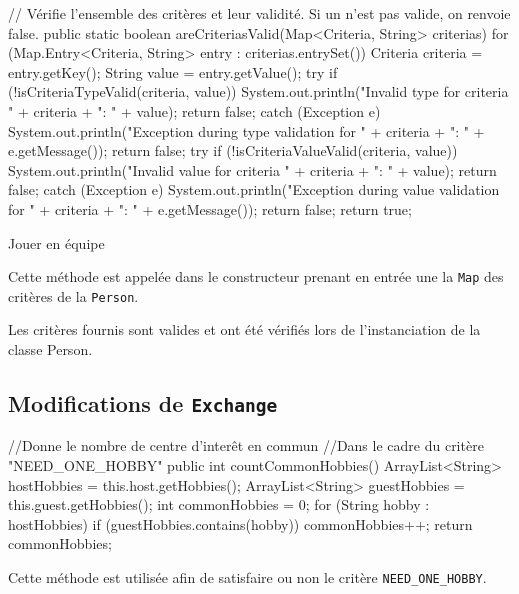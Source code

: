 \documentclass{mytex}
\begin{document}

\begin{codebox}
    // Vérifie l'ensemble des critères et leur validité. Si un n'est pas valide, on renvoie false.
public static boolean areCriteriasValid(Map<Criteria, String> criterias) {
	for (Map.Entry<Criteria, String> entry : criterias.entrySet()) {
		Criteria criteria = entry.getKey();
		String value = entry.getValue();
		try {
			if (!isCriteriaTypeValid(criteria, value)) {
				System.out.println("Invalid type for criteria " + criteria + ": " + value);
				return false;
			}
		} catch (Exception e) {
			System.out.println("Exception during type validation for " + criteria + ": " + e.getMessage());
			return false;
		}
		try {
			if (!isCriteriaValueValid(criteria, value)) {
				System.out.println("Invalid value for criteria " + criteria + ": " + value);
				return false;
			}
		} catch (Exception e) {
			System.out.println("Exception during value validation for " + criteria + ": " + e.getMessage());
			return false;
		}
	}
	return true;
}
\end{codebox}

Jouer en équipe

Cette méthode est appelée dans le constructeur prenant en entrée une la \texttt{Map} des critères de la \texttt{Person}.

Les critères fournis sont valides et ont été vérifiés lors de l'instanciation de la classe Person.
	
\subsection{Modifications de \texttt{Exchange}}


\begin{codebox}
//Donne le nombre de centre d'interêt en commun
//Dans le cadre du critère "NEED_ONE_HOBBY"
public int countCommonHobbies(){
	ArrayList<String> hostHobbies = this.host.getHobbies();
	ArrayList<String> guestHobbies = this.guest.getHobbies();
	int commonHobbies = 0;
	for (String hobby : hostHobbies) {
		if (guestHobbies.contains(hobby)) {
			commonHobbies++;
		}
	}
	return commonHobbies;
}
\end{codebox}

Cette méthode est utilisée afin de satisfaire ou non le critère \texttt{NEED\_ONE\_HOBBY}.

\end{document}
